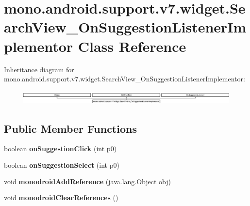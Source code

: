 \hypertarget{classmono_1_1android_1_1support_1_1v7_1_1widget_1_1_search_view___on_suggestion_listener_implementor}{}\section{mono.\+android.\+support.\+v7.\+widget.\+Search\+View\+\_\+\+On\+Suggestion\+Listener\+Implementor Class Reference}
\label{classmono_1_1android_1_1support_1_1v7_1_1widget_1_1_search_view___on_suggestion_listener_implementor}
Inheritance diagram for mono.\+android.\+support.\+v7.\+widget.\+Search\+View\+\_\+\+On\+Suggestion\+Listener\+Implementor\+:\begin{figure}[H]
\begin{center}
\leavevmode
\includegraphics[height=0.790960cm]{classmono_1_1android_1_1support_1_1v7_1_1widget_1_1_search_view___on_suggestion_listener_implementor}
\end{center}
\end{figure}
\subsection*{Public Member Functions}
\begin{DoxyCompactItemize}
\item 
\mbox{\label{classmono_1_1android_1_1support_1_1v7_1_1widget_1_1_search_view___on_suggestion_listener_implementor_adf271189585405221f4ec0056022b836}} 
boolean {\bfseries on\+Suggestion\+Click} (int p0)
\item 
\mbox{\label{classmono_1_1android_1_1support_1_1v7_1_1widget_1_1_search_view___on_suggestion_listener_implementor_aedc377e3efa764d9a340e4fb489d95e7}} 
boolean {\bfseries on\+Suggestion\+Select} (int p0)
\item 
\mbox{\label{classmono_1_1android_1_1support_1_1v7_1_1widget_1_1_search_view___on_suggestion_listener_implementor_a2b53b8bc0b5b5ea851eaf812bf3f33c1}} 
void {\bfseries monodroid\+Add\+Reference} (java.\+lang.\+Object obj)
\item 
\mbox{\label{classmono_1_1android_1_1support_1_1v7_1_1widget_1_1_search_view___on_suggestion_listener_implementor_a18c038c967faebaff57c907d5d3d920b}} 
void {\bfseries monodroid\+Clear\+References} ()
\end{DoxyCompactItemize}
